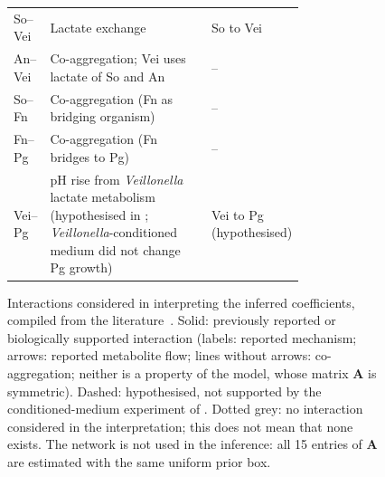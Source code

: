 \documentclass[11pt,a4paper]{article}
\begin{document}
\begin{figure}[htbp]
\begin{minipage}[t]{0.68\textwidth}
\begin{tabular}{@{}l>{\raggedright\arraybackslash}p{0.56\linewidth}>{\raggedright\arraybackslash}p{0.2\linewidth}@{}}
So--Vei & Lactate exchange & So to Vei\\
An--Vei & Co-aggregation; Vei uses lactate of So and An & --\\
So--Fn & Co-aggregation (Fn as bridging organism) & --\\
Fn--Pg & Co-aggregation (Fn bridges to Pg) & --\\
Vei--Pg & pH rise from \textit{Veillonella} lactate metabolism (hypothesised in \citealp{heine2025influence}; \textit{Veillonella}-conditioned medium did not change Pg growth) & Vei to Pg (hypothesised)\\
\bottomrule
\end{tabular}
\label{tab:active}
\end{minipage}
\caption{Interactions considered in interpreting the inferred coefficients, compiled from the literature~\citep{Kolenbrander2010OralMultispecies, heine2025influence}. Solid: previously reported or biologically supported interaction (labels: reported mechanism; arrows: reported metabolite flow; lines without arrows: co-aggregation; neither is a property of the model, whose matrix $\mathbf{A}$ is symmetric). Dashed: hypothesised, not supported by the conditioned-medium experiment of \citet{heine2025influence}. Dotted grey: no interaction considered in the interpretation; this does not mean that none exists. The network is not used in the inference: all 15 entries of $\mathbf{A}$ are estimated with the same uniform prior box.}
\label{fig:network}
\end{figure}
\end{document}
